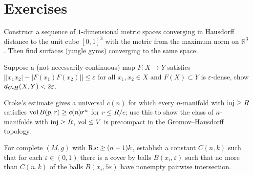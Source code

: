\section{Exercises}

\begin{remark}
  \label{rem:pet-ch11-exercise-11-6-1}
  Construct a sequence of $1$-dimensional metric spaces converging in Hausdorff
  distance to the unit cube $[0,1]^3$ with the metric from the maximum norm on
  $\mathbb{R}^3$. Then find surfaces (jungle gyms) converging to the same
  space.
\end{remark}

\begin{remark}
  \label{rem:pet-ch11-exercise-11-6-2}
  Suppose a (not necessarily continuous) map $F:X\to Y$ satisfies
  $\big||x_1x_2|-|F(x_1)F(x_2)|\big|\le\varepsilon$ for all $x_1,x_2\in X$ and
  $F(X)\subset Y$ is $\varepsilon$-dense, show $d_{G\text{-}H}(X,Y)<2\varepsilon$.
\end{remark}

\begin{remark}
  \label{rem:pet-ch11-exercise-11-6-3}
  Croke's estimate gives a universal $c(n)$ for which every $n$-manifold
  with $\operatorname{inj}\ge R$ satisfies $\operatorname{vol} B(p,r)\ge c(n)r^n$ for $r\le R/e$; use this
  to show the class of $n$-manifolds with $\operatorname{inj}\ge R$, $\operatorname{vol}\le V$ is
  precompact in the Gromov--Hausdorff topology.
\end{remark}

\begin{remark}
  \label{rem:pet-ch11-exercise-11-6-4}
  For complete $(M,g)$ with $\operatorname{Ric}\ge(n-1)k$, establish a constant
  $C(n,k)$ such that for each $\varepsilon\in(0,1)$ there is a cover by balls
  $B(x_i,\varepsilon)$ such that no more than $C(n,k)$ of the balls
  $B(x_i,5\varepsilon)$ have nonempty pairwise intersection.
\end{remark}

